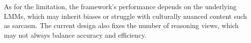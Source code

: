 \documentclass[letterpaper]{article} %
\begin{document}
As for the limitation, the framework’s performance depends on the underlying LMMs, which may inherit biases or struggle with culturally nuanced content such as sarcasm. The current design also fixes the number of reasoning views, which may not always balance accuracy and efficiency. 






\newpage
% 
% 
% 
% 
% 


%
% 
\end{document}
